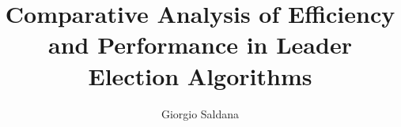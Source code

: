 \documentclass[oneside, 12pt]{unicam_resume}
\title{Comparative Analysis of Efficiency and Performance in Leader Election Algorithms}
\author{Giorgio Saldana}
\begin{document}
\maketitle

\tableofcontents








\appendix
\printindex

\printbibliography

\nocite{*}
\end{document}
